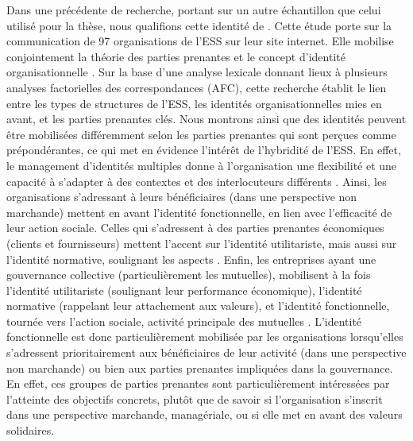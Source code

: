         Dans une précédente de recherche, portant sur un autre échantillon que celui utilisé pour la thèse, nous qualifions cette identité de  \parencite{mariaux2018leconomie}. Cette étude porte sur la communication de 97 organisations de l'ESS sur leur site internet. Elle mobilise conjointement la théorie des parties prenantes \parencite{freeman1994politics, frooman1999stakeholder, laplume2008stakeholder} et le concept d'identité organisationnelle \parencite{scott2000stakeholder, sillince2009multiple}. Sur la base d'une analyse lexicale donnant lieux à plusieurs analyses factorielles des correspondances (AFC), cette recherche établit le lien entre les types de structures de l'ESS, les identités organisationnelles mies en avant, et les parties prenantes clés. Nous montrons ainsi que des identités peuvent être mobilisées différemment selon les parties prenantes qui sont perçues comme prépondérantes, ce qui met en évidence l'intérêt de l'hybridité de l'ESS. En effet, le management d'identités multiples donne à l'organisation une flexibilité et une capacité à s'adapter à des contextes et des interlocuteurs différents \parencite{pratt2000classifying}. Ainsi, les organisations s'adressant à leurs bénéficiaires (dans une perspective non marchande) mettent en avant l'identité fonctionnelle, en lien avec l'efficacité de leur action sociale. Celles qui s'adressent à des parties prenantes économiques (clients et fournisseurs) mettent l'accent sur l'identité utilitariste, mais aussi sur l'identité normative, soulignant les aspects \rse. Enfin, les entreprises ayant une gouvernance collective (particulièrement les mutuelles), mobilisent à la fois l'identité utilitariste (soulignant leur performance économique), l'identité normative (rappelant leur attachement aux valeurs), et l'identité fonctionnelle, tournée vers l'action sociale, activité principale des mutuelles \parencite{mariaux2018leconomie}. L'identité fonctionnelle est donc particulièrement mobilisée par les organisations lorsqu'elles s'adressent prioritairement aux bénéficiaires de leur activité (dans une perspective non marchande) ou bien aux parties prenantes impliquées dans la gouvernance. En effet, ces groupes de parties prenantes sont particulièrement intéressées par l'atteinte des objectifs concrets, plutôt que de savoir si l'organisation s'inscrit dans une perspective marchande, managériale, ou si elle met en avant des valeurs solidaires. \\

